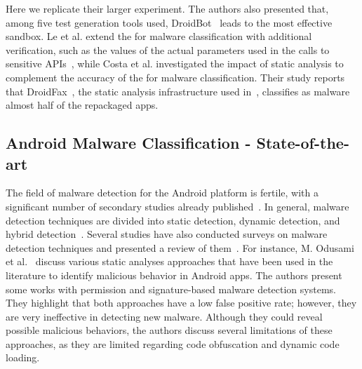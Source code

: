Here we replicate their larger experiment. 
The authors also presented that, among five test generation tools used, DroidBot~\cite{DBLP:conf/icse/LiYGC17} leads to the most effective sandbox.
Le et al. extend the \mas for malware classification with additional verification,
such as the values of the actual parameters used in the
calls to sensitive APIs~\cite{DBLP:conf/iceccs/LeB0GL18}, while
Costa et al.\cite{DBLP:journals/jss/CostaMMSSBNR22} investigated the impact of static analysis to complement the accuracy of the \mas
for malware classification. Their study reports that DroidFax~\cite{DBLP:conf/icsm/CaiR17a}, the static analysis infrastructure used in~\cite{DBLP:conf/wcre/BaoLL18}, classifies as malware almost half of the repackaged apps.


\subsection{Android Malware Classification - State-of-the-art}

The field of malware detection for the Android platform is fertile, with a significant number of secondary studies already published~\cite{DBLP:conf/eann/SerajPP22,DBLP:conf/icsoft/LekssaysFA20,DBLP:journals/access/WeiLWZZY17,DBLP:conf/codaspy/ZhouZJN12}. In general, malware detection techniques are divided into static detection, dynamic detection, and hybrid detection~\cite{choudhary2018haamd}. Several studies have also conducted surveys on malware detection techniques and presented a review of them~\cite{DBLP:journals/access/LiuXXZSL20,DBLP:journals/csur/TamFASC17,DBLP:conf/icai2/OdusamiAMSDM18}. For instance, M. Odusami et al.~\cite{DBLP:conf/icai2/OdusamiAMSDM18} discuss various static analyses approaches that have been used in the literature to identify malicious behavior in Android apps. The authors present some works with permission and signature-based malware detection systems. They highlight that both approaches have a low false positive rate; however, they are very ineffective in detecting new malware. Although they could reveal possible malicious behaviors, the authors discuss several limitations of these approaches, as they are limited regarding code obfuscation and dynamic code loading.

